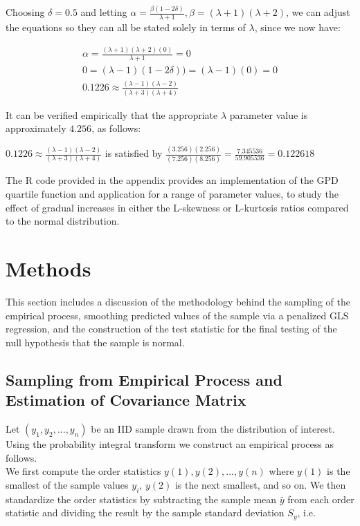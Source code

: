 \documentclass[12pt]{article}
\begin{document}
Choosing $\delta=0.5$ and letting $\alpha=\frac{\beta(1-2\delta)}{\lambda+1},\beta=(\lambda+1)(\lambda+2)$, we can adjust the equations so they can all be stated solely in terms of $\lambda$, since we now have:

\begin{eqnarray*}
\alpha=\frac{(\lambda+1)(\lambda+2)(0)}{\lambda+1}=0\\[10px]
0=(\lambda-1)(1-2\delta))=(\lambda-1)(0)=0\\[10px]
0.1226 \approx \frac{(\lambda-1)(\lambda-2)}{(\lambda+3)(\lambda+4)}
\end{eqnarray*}

It can be verified empirically that the appropriate $\lambda$ parameter value is approximately $4.256$, as follows:

\begin{center}
$0.1226 \approx \frac{(\lambda-1)(\lambda-2)}{(\lambda+3)(\lambda+4)}$ is satisfied by $\frac{(3.256)(2.256)}{(7.256)(8.256)}=\frac{7.345536}{59.905536}=0.122618$
\end{center}

The R code provided in the appendix provides an implementation of the GPD quartile function and application for a range of parameter values, to study the effect of gradual increases in either the L-skewness or L-kurtosis ratios compared to the normal distribution.

\section{Methods}
This section includes a discussion of the methodology behind the sampling of the empirical process, smoothing predicted values of the sample via a penalized GLS regression, and the construction of the test statistic for the final testing of the null hypothesis that the sample is normal.

\subsection{Sampling from Empirical Process and Estimation of Covariance Matrix}

Let $(y_1,y_2, ... ,y_n)$ be an IID sample drawn from the distribution of interest. Using the probability integral transform we construct an empirical process as follows.\\

We first compute the order statistics $y(1),y(2), ... ,y(n)$ where $y(1)$ is the smallest of the sample values $y_i$, $y(2)$ is the next smallest, and so on. We then standardize the order statistics by subtracting the sample mean $\bar{y}$ from each order statistic and dividing the result by the sample standard deviation $S_y$, i.e.
\end{document}
